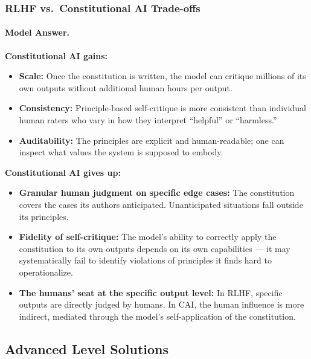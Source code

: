\subsubsection{RLHF vs.\ Constitutional AI Trade-offs}

\paragraph{Model Answer.}

\textbf{Constitutional AI gains:}
\begin{itemize}
    \item \textbf{Scale:} Once the constitution is written, the model can critique millions of its own outputs without additional human hours per output.
    \item \textbf{Consistency:} Principle-based self-critique is more consistent than individual human raters who vary in how they interpret ``helpful'' or ``harmless.''
    \item \textbf{Auditability:} The principles are explicit and human-readable; one can inspect what values the system is supposed to embody.
\end{itemize}

\textbf{Constitutional AI gives up:}
\begin{itemize}
    \item \textbf{Granular human judgment on specific edge cases:} The constitution covers the cases its authors anticipated. Unanticipated situations fall outside its principles.
    \item \textbf{Fidelity of self-critique:} The model's ability to correctly apply the constitution to its own outputs depends on its own capabilities --- it may systematically fail to identify violations of principles it finds hard to operationalize.
    \item \textbf{The humans' seat at the specific output level:} In RLHF, specific outputs are directly judged by humans. In CAI, the human influence is more indirect, mediated through the model's self-application of the constitution.
\end{itemize}

\subsection{Advanced Level Solutions}

